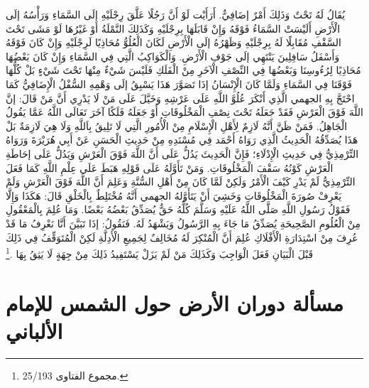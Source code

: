 يُقَالُ لَهُ تَحْتٌ وَذَلِكَ أَمْرٌ إضَافِيٌّ. أَرَأَيْت لَوْ أَنَّ رَجُلًا عَلَّقَ رِجْلَيْهِ إلَى السَّمَاءِ وَرَأْسُهُ إلَى الْأَرْضِ أَلَيْسَتْ السَّمَاءُ فَوْقَهُ وَإِنْ قَابَلَهَا بِرِجْلَيْهِ وَكَذَلِكَ النَّمْلَةُ أَوْ غَيْرُهَا لَوْ مَشَى تَحْتَ السَّقْفِ مُقَابِلًا لَهُ بِرِجْلَيْهِ وَظَهْرُهُ إلَى الْأَرْضِ لَكَانَ الْعُلُوُّ مُحَاذِيًا لَرِجْلَيْهِ وَإِنْ كَانَ فَوْقَهُ وَأَسْفَلُ سَافِلِينَ يَنْتَهِي إلَى جَوْفِ الْأَرْضِ. وَالْكَوَاكِبُ الَّتِي فِي السَّمَاءِ وَإِنْ كَانَ بَعْضُهَا مُحَاذِيًا لِرُءُوسِنَا وَبَعْضُهَا فِي النِّصْفِ الْآخَرِ مِنْ الْفَلَكِ فَلَيْسَ شَيْءٌ مِنْهَا تَحْتَ شَيْءٍ بَلْ كُلُّهَا فَوْقَنَا فِي السَّمَاءِ وَلَمَّا كَانَ الْإِنْسَانُ إذَا تَصَوَّرَ هَذَا يَسْبِقُ إلَى وَهْمِهِ السُّفْلُ الْإِضَافِيُّ كَمَا احْتَجَّ بِهِ الجهمي الَّذِي أَنْكَرَ عُلُوَّ اللَّهِ عَلَى عَرْشِهِ وَخَيَّلَ عَلَى مَنْ لَا يَدْرِي أَنَّ مَنْ قَالَ: إنَّ اللَّهَ فَوْقَ الْعَرْشِ فَقَدْ جَعَلَهُ تَحْتَ نِصْفِ الْمَخْلُوقَاتِ أَوْ جَعَلَهُ فَلَكًا آخَرَ تَعَالَى اللَّهُ عَمَّا يَقُولُ الْجَاهِلُ. فَمَنْ ظَنَّ أَنَّهُ لَازِمٌ لِأَهْلِ الْإِسْلَامِ مِنْ الْأُمُورِ الَّتِي لَا تَلِيقُ بِاَللَّهِ وَلَا هِيَ لَازِمَةٌ بَلْ هَذَا يُصَدِّقُهُ الْحَدِيثُ الَّذِي رَوَاهُ أَحْمَد فِي مُسْنَدِهِ مِنْ حَدِيثِ الْحَسَنِ عَنْ أَبِي هُرَيْرَةَ وَرَوَاهُ التِّرْمِذِيُّ فِي حَدِيثِ الْإِدْلَاءِ؛ فَإِنَّ الْحَدِيثَ يَدُلُّ عَلَى أَنَّ اللَّهَ فَوْقَ الْعَرْشِ وَيَدُلُّ عَلَى إحَاطَةِ الْعَرْشِ كَوْنُهُ سَقْفَ الْمَخْلُوقَاتِ. وَمَنْ تَأَوَّلَهُ عَلَى قَوْلِهِ هَبَطَ عَلَى عِلْمِ اللَّهِ كَمَا فَعَلَ التِّرْمِذِيُّ لَمْ يَدْرِ كَيْفَ الْأَمْرُ وَلَكِنْ لَمَّا كَانَ مِنْ أَهْلِ السُّنَّةِ وَعَلِمَ أَنَّ اللَّهَ فَوْقَ الْعَرْشِ وَلَمْ يَعْرِفْ صُورَةَ الْمَخْلُوقَاتِ وَخَشِيَ أَنْ يَتَأَوَّلهُ الجهمي أَنَّهُ مُخْتَلِطٌ بِالْخَلْقِ قَالَ: هَكَذَا وَإِلَّا فَقَوْلُ رَسُولِ اللَّهِ صَلَّى اللَّهُ عَلَيْهِ وَسَلَّمَ كُلُّهُ حَقٌّ يُصَدِّقُ بَعْضُهُ بَعْضًا. وَمَا عُلِمَ بِالْمَعْقُولِ مِنْ الْعُلُومِ الصَّحِيحَةِ يُصَدِّقُ مَا جَاءَ بِهِ الرَّسُولُ وَيَشْهَدُ لَهُ. فَنَقُولُ: إذَا تَبَيَّنَ أَنَّا نَعْرِفُ مَا قَدْ عُرِفَ مِنْ اسْتِدَارَةِ الْأَفْلَاكِ عُلِمَ أَنَّ الْمُنْكِرَ لَهُ مُخَالِفٌ لِجَمِيعِ الْأَدِلَّةِ لَكِنْ الْمُتَوَقِّفُ فِي ذَلِكَ قَبْلَ الْبَيَانِ فَعَلَ الْوَاجِبَ وَكَذَلِكَ مَنْ لَمْ يَزَلْ يَسْتَفِيدُ ذَلِكَ مِنْ جِهَةٍ لَا يَثِقُ بِهَا \href{https://shamela.ws/book/7289/12641#p1}{\faExternalLink} \cite{ibnTaimia_Majmoo}.\footnote{مجموع الفتاوى 25/193.}

\section{مسألة دوران الأرض حول الشمس للإمام الألباني}
\label{sec:app_solar_system_albani}

